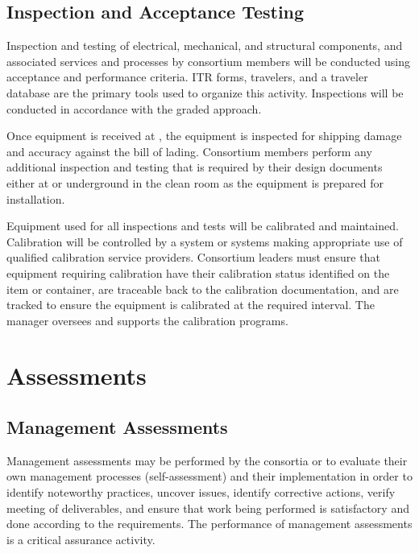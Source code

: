 \subsection{Inspection and Acceptance Testing}

Inspection and testing of electrical, mechanical, and structural
components, and associated services and processes by consortium members
will be conducted using acceptance and performance criteria. ITR
forms, travelers, and a traveler database are the primary tools used
to organize this activity. Inspections will be conducted in accordance
with the graded approach.

Once equipment is received at , the equipment is 
inspected for shipping damage and accuracy against the bill of lading. 
Consortium members perform any additional inspection and testing that 
is required by their design documents either at  or 
underground in the clean room as the equipment is prepared for 
installation.

Equipment used for all inspections and tests will be calibrated and
maintained. Calibration will be controlled by a system or systems
making appropriate use of qualified calibration service
providers. Consortium leaders must ensure that equipment requiring
calibration have their calibration status identified on the item or
container, are traceable back to the calibration documentation, and are
tracked to ensure the equipment is calibrated at the required
interval. The   manager 
oversees and supports the  calibration programs.

\section{Assessments}

\subsection{Management Assessments}

Management assessments may be performed by the consortia or 
to evaluate their own management processes (self-assessment) and their
implementation in order to identify noteworthy practices, uncover issues,
identify corrective actions, verify meeting of deliverables, and
ensure that work being performed is satisfactory and done according to the 
requirements. The performance of management assessments is a critical
assurance activity.

